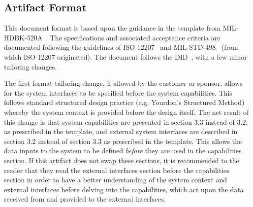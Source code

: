 
\subsection{Artifact Format}
\label{loc:DocOverview_ArtifactFormat}


This document format is based upon the guidance in the \SRD template from MIL-HDBK-520A~\cite{ref__MIL_HDBK_520}.
The specifications and associated acceptance criteria are documented following the guidelines of ISO-12207~\cite{ref__ISO_12207} and MIL-STD-498~\cite{ref__MIL_STD_498} (from which ISO-12207 originated).
The document follows the \SSS DID~\cite{ref__SSS_DID}, with a few minor tailoring changes.

The first format tailoring change, if allowed by the customer or sponsor, allows for the system interfaces to be specified before the system capabilities. 
This follows standard structured design practice (e.g. Yourdon's Structured Method) whereby the system context is provided before the design itself.
The net result of this change is that system capabilities are presented in section 3.3 instead of 3.2, as prescribed in the \SSS template, and external system interfaces are described in section 3.2 instead of section 3.3 as prescribed in the \SSS template.
This allows the data inputs to the system to be defined {\em before} they are used in the capabilities section.
If this artifact does not swap these sections, it is recommended to the reader that they read the external interfaces section before the capabilities section in order to have a better understanding of the system context and external interfaces before delving into the capabilities, which act upon the data received from and provided to the external interfaces.

